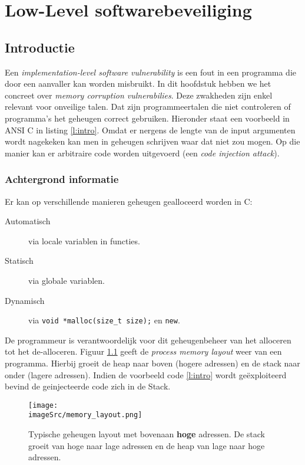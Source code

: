 \documentclass[../main.tex]{subfiles}
\begin{document}
\chapter{Low-Level softwarebeveiliging}
\section{Introductie}
Een \emph{implementation-level software vulnerability} is een fout in een programma die door een aanvaller kan worden misbruikt.
In dit hoofdstuk hebben we het concreet over \emph{memory corruption vulnerabilies}.
Deze zwakheden zijn enkel relevant voor onveilige talen.
Dat zijn programmeertalen die niet controleren of programma's het geheugen correct gebruiken.
Hieronder staat een voorbeeld in ANSI C in listing \ref{l:intro}. Omdat er nergens de lengte van de input argumenten wordt nagekeken kan men in geheugen schrijven waar dat niet zou mogen.
Op die manier kan er arbitraire code worden uitgevoerd (een \emph{code injection attack}).



\subsection{Achtergrond informatie}
Er kan op verschillende manieren geheugen gealloceerd worden in C:
\begin{description}
	\item[Automatisch] via locale variablen in functies.
	\item[Statisch] via globale variablen.
	\item[Dynamisch] via \lstinline[style=ilcstyle]{void *malloc(size_t size);} en \lstinline[style=ilcstyle]{new}.
\end{description}
De programmeur is verantwoordelijk voor dit geheugenbeheer van het alloceren tot het de-alloceren.
Figuur \ref{f:mem_lay} geeft de \emph{process memory layout} weer van een programma.
Hierbij groeit de heap naar boven (hogere adressen) en de stack naar onder (lagere adressen).
Indien de voorbeeld code \ref{l:intro} wordt ge\"exploiteerd bevind de geinjecteerde code zich in de Stack.
\begin{figure}
\centering
\texttt{[image: \\imageSrc/memory\_layout.png]}
\caption{Typische geheugen layout met bovenaan \textbf{hoge} adressen. De stack groeit van hoge naar lage adressen en de heap van lage naar hoge adressen.}
\label{f:mem_lay}
\end{figure}
\end{document}
